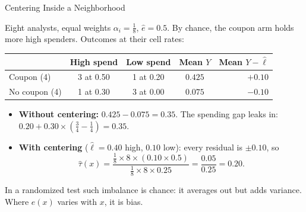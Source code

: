 \documentclass[aspectratio=169, 11pt, handout]{beamer}
\newcommand{\hatt}{\hat{\tau}}
\begin{document}
\begin{frame}{Centering Inside a Neighborhood}

Eight analysts, equal weights $\alpha_i = \tfrac18$, $\hat e = 0.5$. By chance, the coupon arm holds more high spenders. Outcomes at their cell rates:

\begin{center}
\small
\begin{tabular}{lcccr}
\toprule
& \textbf{High spend} & \textbf{Low spend} & \textbf{Mean $Y$} & \textbf{Mean $Y - \hat\ell$} \\
\midrule
Coupon (4) & 3 at 0.50 & 1 at 0.20 & $0.425$ & $+0.10$ \\
No coupon (4) & 1 at 0.30 & 3 at 0.00 & $0.075$ & $-0.10$ \\
\bottomrule
\end{tabular}
\end{center}

\medskip

\begin{itemize}
  \item \textbf{Without centering:} $0.425 - 0.075 = 0.35$. The spending gap leaks in: $0.20 + 0.30 \times (\tfrac34 - \tfrac14) = 0.35$.
  \item \textbf{With centering} ($\hat\ell = 0.40$ high, $0.10$ low): every residual is $\pm 0.10$, so
  \[
  \hatt(x) = \frac{\tfrac18 \times 8 \times (0.10 \times 0.5)}{\tfrac18 \times 8 \times 0.25} = \frac{0.05}{0.25} = 0.20 .
  \]
\end{itemize}

\medskip

In a randomized test such imbalance is chance: it averages out but adds variance. Where $e(x)$ varies with $x$, it is bias.
\end{frame}
\end{document}
